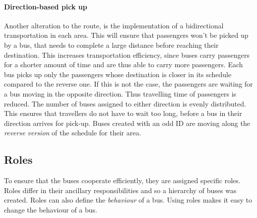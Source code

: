 \documentclass{article}
\begin{document}
\paragraph{Direction-based pick up}
Another alteration to the route, is the implementation of a bidirectional transportation in each area. This will ensure that passengers won't be picked up by a bus,  that needs to complete a large distance before reaching their destination. This increases transportation efficiency, since buses carry passengers for a shorter amount of time and are thus able to carry more passengers. 
\newline
Each bus picks up only the passengers whose destination is closer in its schedule compared to the reverse one. If this is not the case, the passengers are waiting for a bus moving in the opposite direction. Thus travelling time of passengers is reduced. 
\newline
The number of buses assigned to either direction is evenly distributed. This ensures that travellers do not have to wait too long, before a bus in their direction arrives for pick-up. Buses created with an odd ID are moving along the \textit{reverse version} of the schedule for their area.

\subsection{Roles}
To ensure that the buses cooperate efficiently, they are assigned specific roles. Roles differ in their ancillary responsibilities and so a hierarchy of buses was created. 
\newline
Roles can also define the \textit{behaviour} of a bus. Using roles makes it easy to change the behaviour of a bus. 
\end{document}
